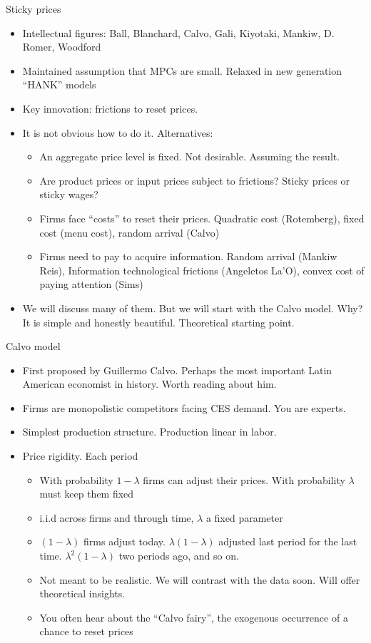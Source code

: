 \documentclass[11pt,aspectratio=169,xcolor={dvipsnames},hyperref={pdftex,pdfpagemode=UseNone,hidelinks,pdfdisplaydoctitle=true},usepdftitle=false]{beamer}
\begin{document}
\begin{frame}{Sticky prices}
\begin{itemize}
\item Intellectual figures: Ball, Blanchard, Calvo, Gali, Kiyotaki, Mankiw, D. Romer, Woodford
\pause
\item Maintained assumption that MPCs are small. Relaxed in new generation ``HANK'' models
\pause
\item Key innovation: frictions to reset prices.
\pause
\item It is not obvious how to do it. Alternatives:
\pause
\begin{itemize}
\item An aggregate price level is fixed. Not desirable. Assuming the result.
\pause
\item Are product prices or input prices subject to frictions? Sticky prices or sticky wages?
\pause
\item Firms face ``costs'' to reset their prices. Quadratic cost (Rotemberg), fixed cost (menu cost), random arrival (Calvo)
\pause
\item Firms need to pay to acquire information. Random arrival (Mankiw Reis), Information technological frictions (Angeletos La'O), convex cost of paying attention (Sims)
\end{itemize}
\pause
\item We will discuss many of them. But we will start with the Calvo model. Why? It is simple and honestly beautiful. Theoretical starting point.
\end{itemize}
\end{frame}

\begin{frame}{Calvo model}
\begin{itemize}
\item First proposed by Guillermo Calvo. Perhaps the most important Latin American economist in history. Worth reading about him. \pause
\item Firms are monopolistic competitors facing CES demand. You are experts.
\pause
\item Simplest production structure. Production linear in labor.
\pause
\item Price rigidity. Each period
\begin{itemize}
\item With probability $1-\lambda$ firms can adjust their prices. With probability $\lambda$ must keep them fixed
\pause
\item i.i.d across firms and through time, $\lambda$ a fixed parameter
\pause
\item $(1-\lambda)$ firms adjust today. $\lambda(1-\lambda)$ adjusted last period for the last time. $\lambda^2(1-\lambda)$ two periods ago, and so on.
\pause
\item Not meant to be realistic. We will contrast with the data soon. Will offer theoretical insights.
\pause
\item You often hear about the ``Calvo fairy'', the exogenous occurrence of a chance to reset prices
\end{itemize}
\end{itemize}
\end{frame}
\end{document}
